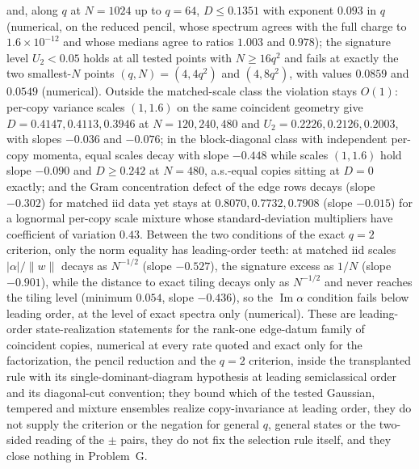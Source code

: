 and, along \(q\) at \(N=1024\) up to \(q=64\), \(D\le0.1351\) with exponent \(0.093\) in \(q\) (numerical, on the reduced pencil, whose spectrum agrees with the full charge to \(1.6\times10^{-12}\) and whose medians agree to ratios \(1.003\) and \(0.978\)); the signature level \(U_2<0.05\) holds at all tested points with \(N\ge16q^{2}\) and fails at exactly the two smallest-\(N\) points \((q,N)=(4,4q^{2})\) and \((4,8q^{2})\), with values \(0.0859\) and \(0.0549\) (numerical). Outside the matched-scale class the violation stays \(O(1)\): per-copy variance scales \((1,1.6)\) on the same coincident geometry give \(D=0.4147,0.4113,0.3946\) at \(N=120,240,480\) and \(U_2=0.2226,0.2126,0.2003\), with slopes \(-0.036\) and \(-0.076\); in the block-diagonal class with independent per-copy momenta, equal scales decay with slope \(-0.448\) while scales \((1,1.6)\) hold slope \(-0.090\) and \(D\ge0.242\) at \(N=480\), a.s.-equal copies sitting at \(D=0\) exactly; and the Gram concentration defect of the edge rows decays (slope \(-0.302\)) for matched iid data yet stays at \(0.8070,0.7732,0.7908\) (slope \(-0.015\)) for a lognormal per-copy scale mixture whose standard-deviation multipliers have coefficient of variation \(0.43\). Between the two conditions of the exact \(q=2\) criterion, only the norm equality has leading-order teeth: at matched iid scales \(|\alpha|/\|w\|\) decays as \(N^{-1/2}\) (slope \(-0.527\)), the signature excess as \(1/N\) (slope \(-0.901\)), while the distance to exact tiling decays only as \(N^{-1/2}\) and never reaches the tiling level (minimum \(0.054\), slope \(-0.436\)), so the \(\operatorname{Im}\alpha\) condition fails below leading order, at the level of exact spectra only (numerical). These are leading-order state-realization statements for the rank-one edge-datum family of coincident copies, numerical at every rate quoted and exact only for the factorization, the pencil reduction and the \(q=2\) criterion, inside the transplanted rule with its single-dominant-diagram hypothesis at leading semiclassical order and its diagonal-cut convention; they bound which of the tested Gaussian, tempered and mixture ensembles realize copy-invariance at leading order, they do not supply the criterion or the negation for general \(q\), general states or the two-sided reading of the \(\pm\) pairs, they do not fix the selection rule itself, and they close nothing in Problem~G.

